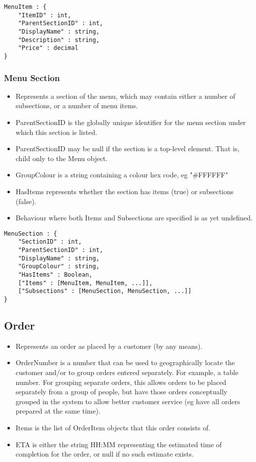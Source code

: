 \documentclass[12pt, a4paper]{article}
\begin{document}
\begin{verbatim}
MenuItem : {
	"ItemID" : int,
	"ParentSectionID" : int,
	"DisplayName" : string,
	"Description" : string,
	"Price" : decimal
}
\end{verbatim}


\subsubsection{Menu Section}\label{subsubsec:MenuSection}

\begin{itemize}
\item Represents a section of the menu, which may contain either a number of subsections, or a number of menu items.
\item ParentSectionID is the globally unique identifier for the menu section under which this section is listed.
\item ParentSectionID may be null if the section is a top-level element. That is, child only to the Menu object.
\item GroupColour is a string containing a colour hex code, eg "\#FFFFFF"
\item HasItems represents whether the section has items (true) or subsections (false).
\item Behaviour where both Items and Subsections are specified is as yet undefined. 
\end{itemize}

\begin{verbatim}
MenuSection : {
	"SectionID" : int,
	"ParentSectionID" : int,
	"DisplayName" : string,
	"GroupColour" : string,
	"HasItems" : Boolean,
	["Items" : [MenuItem, MenuItem, ...]],
	["Subsections" : [MenuSection, MenuSection, ...]]
}
\end{verbatim}


\pagebreak
\subsection{Order}\label{subsec:Order}

\begin{itemize}
\item Represents an order as placed by a customer (by any means).
\item OrderNumber is a number that can be used to geographically locate the customer and/or to group orders entered separately. For example, a table number.
For grouping separate orders, this allows orders to be placed separately from a group of people, but have those orders conceptually grouped in the system to allow better customer service (eg have all orders prepared at the same time).
\item Items is the list of OrderItem objects that this order consists of.
\item ETA is either the string HH:MM representing the estimated time of completion for the order, or null if no such estimate exists.
\end{itemize}
\end{document}
